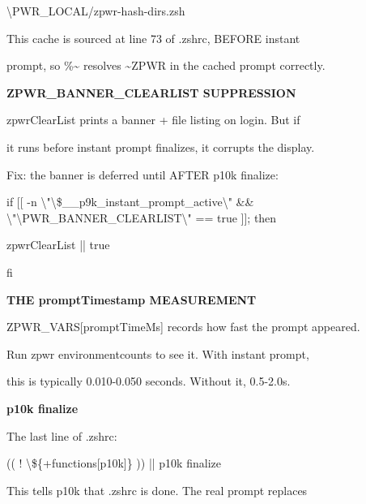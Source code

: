\documentclass[11pt,a4paper,twoside]{book}
\begin{document}
\begin{codebox}
\textbackslash{}PWR\_LOCAL/zpwr-hash-dirs.zsh\\
\end{codebox}

This cache is sourced at line 73 of .zshrc, BEFORE instant

prompt, so \%\textasciitilde{} resolves \textasciitilde{}ZPWR in the cached prompt correctly.


\vspace{12pt}
{\bfseries\color{neonyellow} ZPWR\_BANNER\_CLEARLIST SUPPRESSION}\vspace{4pt}

zpwrClearList prints a banner + file listing on login. But if

it runs before instant prompt finalizes, it corrupts the display.

Fix: the banner is deferred until AFTER p10k finalize:

if [[ -n \textbackslash{}"\textbackslash{}\$\_\_p9k\_instant\_prompt\_active\textbackslash{}" \&\& \textbackslash{}"\textbackslash{}PWR\_BANNER\_CLEARLIST\textbackslash{}" == true ]]; then

\begin{codebox}
zpwrClearList || true\\
\end{codebox}

fi


\vspace{12pt}
{\bfseries\color{neonyellow} THE promptTimestamp MEASUREMENT}\vspace{4pt}

ZPWR\_VARS[promptTimeMs] records how fast the prompt appeared.

\begin{codebox}
Run zpwr environmentcounts to see it. With instant prompt,\\
\end{codebox}

this is typically 0.010-0.050 seconds. Without it, 0.5-2.0s.


\vspace{12pt}
{\bfseries\color{neonyellow} p10k finalize}\vspace{4pt}

The last line of .zshrc:

(( ! \textbackslash{}\$\{+functions[p10k]\} )) || p10k finalize

This tells p10k that .zshrc is done. The real prompt replaces
\end{document}
